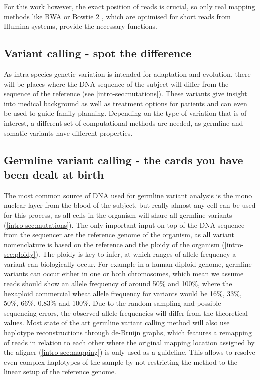 For this work however, the exact position of reads is crucial, so only real mapping methods like BWA \cite{Li2013} or Bowtie 2 \cite{Langmead2018}, which are optimised for short reads from Illumina systems, provide the necessary functions.


\subsection[Variant calling]{Variant calling - spot the difference}
\label{intro-sec:variantcalling}
As intra-species genetic variation is intended for adaptation and evolution, there will be places where the DNA sequence of the subject will differ from the sequence of the reference (see \autoref{intro-sec:mutations}). These variants give insight into medical background as well as treatment options for patients and can even be used to guide family planning. Depending on the type of variation that is of interest, a different set of computational methods are needed, as germline and somatic variants have different properties.

\subsection[Germline]{Germline variant calling - the cards you have been dealt at birth}
\label{intro-sec:germlinecalling}
The most common source of DNA used for germline variant analysis is the mono nuclear layer from the blood of the subject, but really almost any cell can be used for this process, as all cells in the organism will share all germline variants (\autoref{intro-sec:mutations}). The only important input on top of the DNA sequence from the sequencer are the reference genome of the organism, as all variant nomenclature is based on the reference and the ploidy of the organism (\autoref{intro-sec:ploidy}). The ploidy is key to infer, at which ranges of allele frequency a variant can biologically occur. For example in a human diploid genome, germline variants can occur either in one or both chromosomes, which mean we assume reads should show an allele frequency of around 50\% and 100\%, where the hexaploid commercial wheat \cite{Mayer2014} allele frequency for variants would be 16\%, 33\%, 50\%, 66\%, 0.83\% and 100\%. Due to the random sampling and possible sequencing errors, the observed allele frequencies will differ from the theoretical values. 
Most state of the art germline variant calling method will also use haplotype reconstructions through de-Bruijn graphs, which features a remapping of reads in relation to each other \cite{Garrison2012,Lai2016,Kim2018,Benjamin2019,Cooke2021} where the original mapping location assigned by the aligner (\autoref{intro-sec:mapping}) is only used as a guideline. This allows to resolve even complex haplotypes of the sample by not restricting the method to the linear setup of the reference genome.


